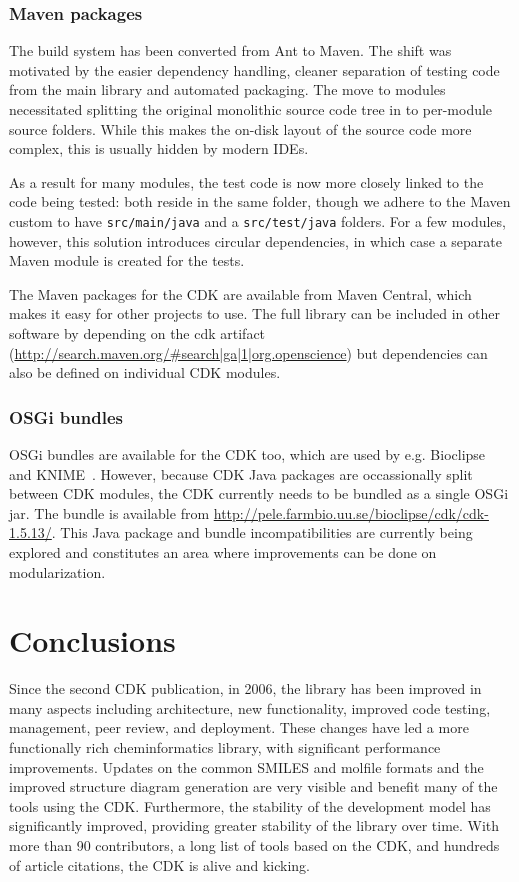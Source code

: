 \documentclass[doublespacing]{bmcart}
\begin{document}
\subsubsection*{Maven packages}

The build system has been converted from Ant to Maven. The shift was
motivated by the easier dependency handling, cleaner separation of
testing code from the main library and automated packaging. The move
to modules necessitated splitting the original monolithic source code
tree in to per-module source folders. While this makes the on-disk
layout of the source code more complex, this is usually hidden by
modern IDEs.

As a result for many modules, the test code is now more closely linked
to the code being tested: both reside in the same folder, though we
adhere to the Maven custom to have \texttt{src/main/java} and a
\texttt{src/test/java} folders.  For a few modules, however, this
solution introduces circular dependencies, in which case a separate
Maven module is created for the tests.

The Maven packages for the CDK are available from Maven Central, which makes it
easy for other projects to use. The full library can be included in other
software by depending on the cdk artifact (\url{http://search.maven.org/#search|ga|1|org.openscience})
but dependencies can also be defined on individual CDK modules.

\subsubsection*{OSGi bundles}

OSGi bundles are available for the CDK too, which are used by e.g.
Bioclipse~\cite{spjuth2007bioclipse,spjuth2009bioclipse} and
KNIME~\cite{Beisken2013}. However, because CDK Java packages are occassionally
split between CDK modules, the CDK currently needs to be bundled as a single
OSGi jar. The bundle is available from \url{http://pele.farmbio.uu.se/bioclipse/cdk/cdk-1.5.13/}.
This Java package and bundle incompatibilities are currently being explored and
constitutes an area where improvements can be done on modularization.



\section*{Conclusions}

Since the second CDK publication, in 2006, the library has been improved
in many aspects including architecture, new functionality, improved
code testing, management, peer review, and deployment. These changes have led a more
functionally rich cheminformatics library, with significant
performance improvements. Updates on the common SMILES and molfile
formats and the improved structure diagram generation are very visible
and benefit many of the tools using the CDK.  Furthermore, the
stability of the development model has significantly improved,
providing greater stability of the library over time.
With more than 90 contributors, a long list of tools based on the CDK, and
hundreds of article citations, the CDK is alive and kicking.
\end{document}
